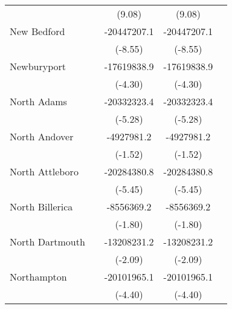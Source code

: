 {\begin{tabular}{l*{4}{c}}
                    &                     &      (9.08)         &      (9.08)         &                     \\
\addlinespace
New Bedford         &                     & -20447207.1\sym{***}& -20447207.1\sym{***}&                     \\
                    &                     &     (-8.55)         &     (-8.55)         &                     \\
\addlinespace
Newburyport         &                     & -17619838.9\sym{***}& -17619838.9\sym{***}&                     \\
                    &                     &     (-4.30)         &     (-4.30)         &                     \\
\addlinespace
North Adams         &                     & -20332323.4\sym{***}& -20332323.4\sym{***}&                     \\
                    &                     &     (-5.28)         &     (-5.28)         &                     \\
\addlinespace
North Andover       &                     &  -4927981.2         &  -4927981.2         &                     \\
                    &                     &     (-1.52)         &     (-1.52)         &                     \\
\addlinespace
North Attleboro     &                     & -20284380.8\sym{***}& -20284380.8\sym{***}&                     \\
                    &                     &     (-5.45)         &     (-5.45)         &                     \\
\addlinespace
North Billerica     &                     &  -8556369.2         &  -8556369.2         &                     \\
                    &                     &     (-1.80)         &     (-1.80)         &                     \\
\addlinespace
North Dartmouth     &                     & -13208231.2\sym{*}  & -13208231.2\sym{*}  &                     \\
                    &                     &     (-2.09)         &     (-2.09)         &                     \\
\addlinespace
Northampton         &                     & -20101965.1\sym{***}& -20101965.1\sym{***}&                     \\
                    &                     &     (-4.40)         &     (-4.40)         &                     \\

\end{tabular}}
